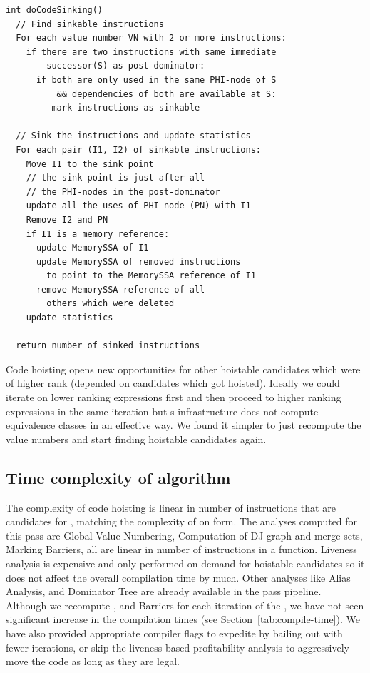 \documentclass[sigplan,10pt,review,anonymous]{acmart}\settopmatter{printfolios=true,printccs=false,printacmref=false}
\begin{document}
\begin{verbatim}
int doCodeSinking()
  // Find sinkable instructions
  For each value number VN with 2 or more instructions:
    if there are two instructions with same immediate
        successor(S) as post-dominator:
      if both are only used in the same PHI-node of S
          && dependencies of both are available at S:
         mark instructions as sinkable

  // Sink the instructions and update statistics
  For each pair (I1, I2) of sinkable instructions:
    Move I1 to the sink point
    // the sink point is just after all
    // the PHI-nodes in the post-dominator
    update all the uses of PHI node (PN) with I1
    Remove I2 and PN
    if I1 is a memory reference:
      update MemorySSA of I1
      update MemorySSA of removed instructions
        to point to the MemorySSA reference of I1
      remove MemorySSA reference of all
        others which were deleted
    update statistics

  return number of sinked instructions
\end{verbatim}

Code hoisting opens new opportunities for other hoistable candidates which were
of higher rank (depended on candidates which got hoisted). Ideally we could
iterate on lower ranking expressions first and then proceed to higher ranking
expressions in the same iteration but s \GVN{} infrastructure does not
compute equivalence classes in an effective way. We found it simpler to just
recompute the value numbers and start finding hoistable candidates again.

\subsection{Time complexity of algorithm}
The complexity of code hoisting is linear in number of instructions that are
candidates for \gcm{}, matching the complexity of \PRE{} on \SSA{} form.
The analyses computed for this pass are Global Value Numbering, Computation of
DJ-graph and merge-sets, Marking Barriers, all are linear in number of
instructions in a function. Liveness analysis is expensive and only performed
on-demand for hoistable candidates so it does not affect the overall compilation
time by much. Other analyses like Alias Analysis, \MemorySSA{} and Dominator Tree
are already available in the \LLVM{} pass pipeline. Although we recompute \GVN{}, and
Barriers for each iteration of the \gcm{}, we have not seen significant
increase in the compilation times (see Section~\ref{tab:compile-time}). We have also
provided appropriate compiler
flags to expedite \gcm{} by bailing out with fewer iterations, or skip the
liveness based profitability analysis to aggressively move the code as long as
they are legal.
\end{document}

